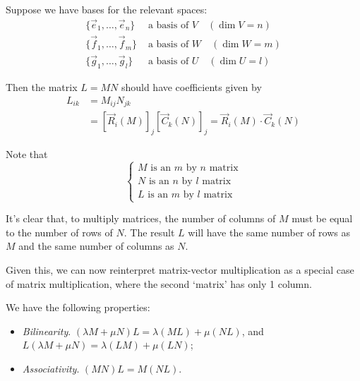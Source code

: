 \documentclass{../../template/note}
\begin{document}

    Suppose we have bases for the relevant spaces:
    \begin{align*}
        \{\vec e_1, \dots, \vec e_n\} &\text{ a basis of } V \quad (\dim V = n)\\
        \{\vec f_1, \dots, \vec f_m\} &\text{ a basis of } W \quad (\dim W = m)\\
        \{\vec g_1, \dots, \vec g_l\} &\text{ a basis of } U \quad (\dim U = l)
    \end{align*}

    Then the matrix \(L = MN\) should have coefficients given by
    \begin{align*}
        L_{ik} &= M_{ij}N_{jk} \\
        &= [\vec R_i(M)]_j [\vec C_k(N)]_j = \vec R_i(M) \cdot \vec C_k(N)
    \end{align*}

    Note that
    \[
        \begin{cases}
            M \text{ is an } m \text{ by } n \text{ matrix} \\
            N \text{ is an } n \text{ by } l \text{ matrix} \\
            L \text{ is an } m \text{ by } l \text{ matrix}
        \end{cases}
    \]

    \begin{remark}
        It's clear that, to multiply matrices, the number of columns of \(M\) must be equal to the number of rows of \(N\). The result \(L\) will have the same number of rows as \(M\) and the same number of columns as \(N\).
    \end{remark}
    
    \begin{remark}
        Given this, we can now reinterpret matrix-vector multiplication as a special case of matrix multiplication, where the second `matrix' has only 1 column.
    \end{remark}
    
    We have the following properties:

    \begin{itemize}
        \item \emph{Bilinearity}. \((\lambda M + \mu N)L = \lambda(ML) + \mu(NL)\), and \(L(\lambda M + \mu N) = \lambda(LM) + \mu(LN)\);
        \item \emph{Associativity}. \((MN)L = M(NL)\).
    \end{itemize}
    
\end{document}

